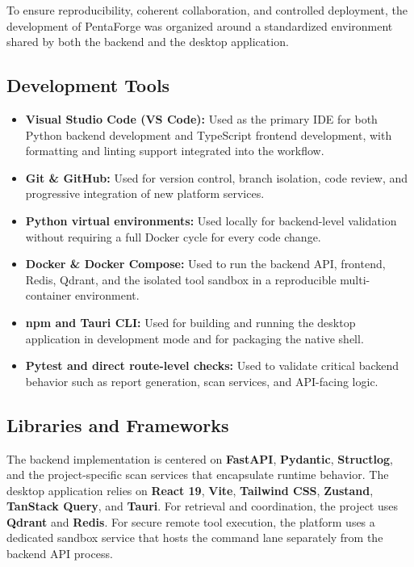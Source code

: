 \documentclass[12pt,a4paper]{report}
\begin{document}
To ensure reproducibility, coherent collaboration, and controlled deployment, the
development of PentaForge was organized around a standardized environment shared by
both the backend and the desktop application.

\subsection{Development Tools}

\begin{itemize}
    \item \textbf{Visual Studio Code (VS Code):} Used as the primary IDE for both
    Python backend development and TypeScript frontend development, with formatting
    and linting support integrated into the workflow.
    \item \textbf{Git \& GitHub:} Used for version control, branch isolation, code
    review, and progressive integration of new platform services.
    \item \textbf{Python virtual environments:} Used locally for backend-level
    validation without requiring a full Docker cycle for every code change.
    \item \textbf{Docker \& Docker Compose:} Used to run the backend API, frontend,
    Redis, Qdrant, and the isolated tool sandbox in a reproducible multi-container
    environment.
    \item \textbf{npm and Tauri CLI:} Used for building and running the desktop
    application in development mode and for packaging the native shell.
    \item \textbf{Pytest and direct route-level checks:} Used to validate critical
    backend behavior such as report generation, scan services, and API-facing logic.
\end{itemize}

\subsection{Libraries and Frameworks}

The backend implementation is centered on \textbf{FastAPI}, \textbf{Pydantic},
\textbf{Structlog}, and the project-specific scan services that encapsulate runtime
behavior. The desktop application relies on \textbf{React 19}, \textbf{Vite},
\textbf{Tailwind CSS}, \textbf{Zustand}, \textbf{TanStack Query}, and \textbf{Tauri}.
For retrieval and coordination, the project uses \textbf{Qdrant} and \textbf{Redis}.
For secure remote tool execution, the platform uses a dedicated sandbox service that
hosts the command lane separately from the backend API process.
\end{document}
